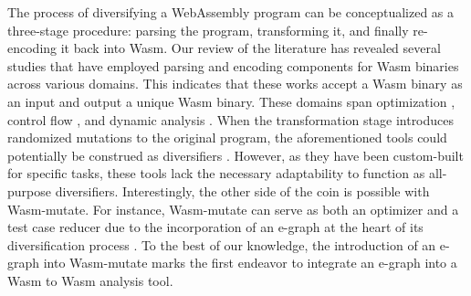 \documentclass[sigplan,screen]{acmart}
\newcommand*\badge[1]{ \colorbox{red}{\color{white}#1}}
\newcommand{\tool}{Wasm-mutate\xspace}
\newcommand{\wasm}{Wasm\xspace}
\newcommand{\Wasm}{WebAssembly\xspace}
\newcommand{\todo}[1]{%
\refstepcounter{todo}
\noindent\textbf{\badge{TODO}} {\color{red}#1}
\addcontentsline{td}{todo}
{\color{red}\thesection.\thetodo\xspace #1}}
\begin{document}
The process of diversifying a \Wasm program can be conceptualized as a three-stage procedure: parsing the program, transforming it, and finally re-encoding it back into \wasm. 
Our review of the literature has revealed several studies that have employed parsing and encoding components for \wasm binaries across various domains. 
This indicates that these works accept a \wasm binary as an input and output a unique \wasm binary. 
These domains span optimization \cite{wasmslim}, control flow \cite{10123627}, and dynamic analysis \cite{wasabi, stievenart2020compositional, 10123627, BRITO2022102745}.
When the transformation stage introduces randomized mutations to the original program, the aforementioned tools could potentially be construed as diversifiers \cite{some paper claming this}.
However, as they have been custom-built for specific tasks, these tools lack the necessary adaptability to function as all-purpose diversifiers. 
Interestingly, the other side of the coin is possible with \tool.
For instance, \tool can serve as both an optimizer and a test case reducer due to the incorporation of an e-graph at the heart of its diversification process \cite{10.1145/1480881.1480915}. 
To the best of our knowledge, the introduction of an e-graph into \tool marks the first endeavor to integrate an e-graph into a \wasm to \wasm analysis tool.



\end{document}
